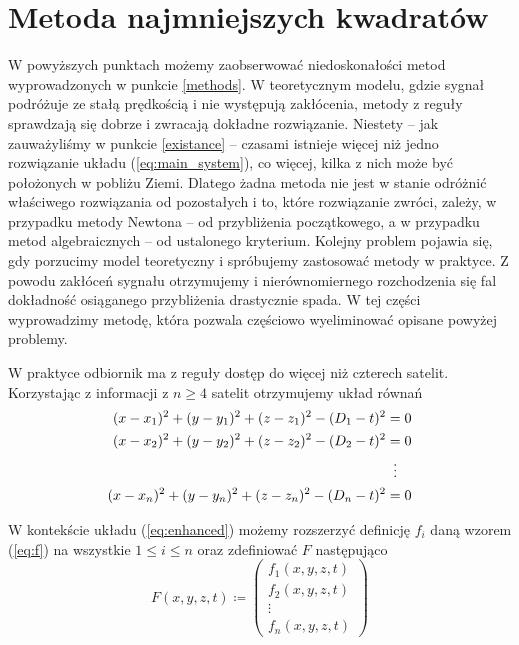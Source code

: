 \documentclass{article}
\begin{document}
\section{Metoda najmniejszych kwadratów}
W powyższych punktach możemy zaobserwować niedoskonałości metod wyprowadzonych w punkcie \ref{methods}.
W teoretycznym modelu, gdzie sygnał podróżuje ze stałą prędkością i nie występują zakłócenia, metody z reguły
sprawdzają się dobrze i zwracają dokładne rozwiązanie. Niestety -- jak zauważyliśmy w punkcie \ref{existance} --
czasami istnieje więcej niż jedno rozwiązanie układu
(\ref{eq:main_system}), co więcej, kilka z nich może być położonych w pobliżu Ziemi. Dlatego żadna metoda nie jest w stanie
odróżnić właściwego rozwiązania od pozostałych i to, które rozwiązanie zwróci, zależy, w przypadku metody
Newtona -- od przybliżenia początkowego, a w przypadku metod algebraicznych -- od ustalonego kryterium.
Kolejny problem pojawia się, gdy porzucimy model teoretyczny i spróbujemy zastosować metody w praktyce.
Z powodu zakłóceń sygnału otrzymujemy i nierównomiernego rozchodzenia się fal dokładność osiąganego przybliżenia drastycznie spada.
W tej części wyprowadzimy metodę, która pozwala częściowo wyeliminować opisane powyżej problemy.

W praktyce odbiornik ma z reguły dostęp do więcej niż czterech satelit.
Korzystając z informacji z $n \geq 4$ satelit otrzymujemy układ równań
\begin{align}
\begin{aligned}
    \label{eq:enhanced}
    (x-x_1)^2 + (y-y_1)^2 + (z-z_1)^2 - (D_1 -t)^2 &= 0 \\
    (x-x_2)^2 + (y-y_2)^2 + (z-z_2)^2 - (D_2 -t)^2 &= 0 \\
    &\vdotswithin{=} \\
    (x-x_n)^2 + (y-y_n)^2 + (z-z_n)^2 - (D_n -t)^2 &= 0 \\
\end{aligned}
\end{align}

W kontekście układu (\ref{eq:enhanced}) możemy rozszerzyć definicję $f_i$ daną wzorem (\ref{eq:f})
na wszystkie $1 \leq i \leq n$ oraz zdefiniować $F$ następująco
\begin{equation}
    \label{eq:newF}
    F(x, y, z, t) \coloneqq
    \begin{pmatrix}
        f_1(x, y, z, t) \\
        f_2(x, y, z, t) \\
        \vdots \\
        f_n(x, y, z, t)
    \end{pmatrix}
\end{equation}
\end{document}
